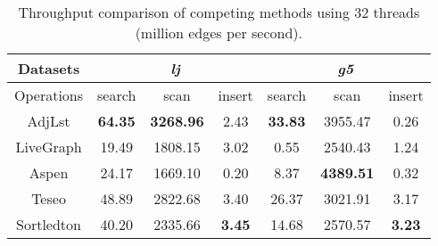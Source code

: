 \begin{table}[t]
\captionsetup{skip=0pt}
\setlength{\abovecaptionskip}{0pt}
\setlength{\belowcaptionskip}{0pt}
    \caption{Throughput comparison of competing methods using 32 threads (million edges per second).}
    \label{tab:performance_under_32_threads}
    \centering

\small
\begin{tabular}{|c|ccc|ccc|}
\hline
\textbf{Datasets}   & \multicolumn{3}{c|}{\textbf{\emph{lj}}}                               & \multicolumn{3}{c|}{\textbf{\emph{g5}}}                                        \\ \hline
Operations & \multicolumn{1}{c|}{search} & \multicolumn{1}{c|}{scan}    & insert & \multicolumn{1}{c|}{search} & \multicolumn{1}{c|}{scan}             & insert \\ \hline
AdjLst &
  \multicolumn{1}{c|}{\textbf{64.35}} &
  \multicolumn{1}{c|}{\textbf{3268.96}} &
  2.43 &
  \multicolumn{1}{c|}{\textbf{33.83}} &
  \multicolumn{1}{c|}{3955.47} &
  0.26 \\ \hline
LiveGraph  & \multicolumn{1}{c|}{19.49}  & \multicolumn{1}{c|}{1808.15} & 3.02   & \multicolumn{1}{c|}{0.55}   & \multicolumn{1}{c|}{2540.43}          & 1.24   \\ \hline
Aspen      & \multicolumn{1}{c|}{24.17}  & \multicolumn{1}{c|}{1669.10} & 0.20   & \multicolumn{1}{c|}{8.37}   & \multicolumn{1}{c|}{\textbf{4389.51}} & 0.32   \\ \hline
Teseo      & \multicolumn{1}{c|}{48.89}  & \multicolumn{1}{c|}{2822.68} & 3.40   & \multicolumn{1}{c|}{26.37}  & \multicolumn{1}{c|}{3021.91}          & 3.17   \\ \hline
Sortledton &
  \multicolumn{1}{c|}{40.20} &
  \multicolumn{1}{c|}{2335.66} &
  \textbf{3.45} &
  \multicolumn{1}{c|}{14.68} &
  \multicolumn{1}{c|}{2570.57} &
  \textbf{3.23} \\ \hline
\end{tabular}%
\end{table}



